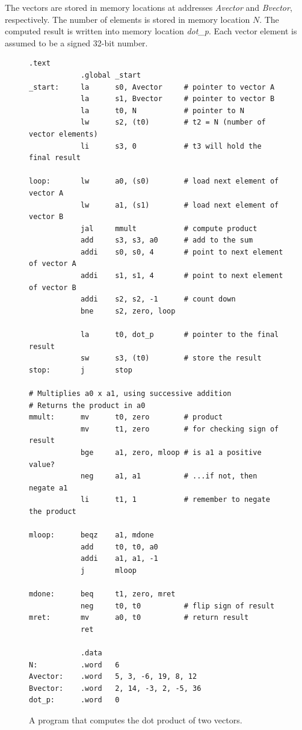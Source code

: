 \documentclass[11pt, twoside, pdftex]{article}
\begin{document}
\noindent
The vectors are stored in memory locations at addresses
{\it Avector} and {\it Bvector}, respectively. The number of elements
is stored in memory location $N$. The computed result is written
into memory location {\it dot\_p}. Each vector element is assumed to be a
signed 32-bit number.

\begin{figure}[H]
\begin{lstlisting}[style=defaultNiosVStyle]
            .text
            .global _start
_start:     la      s0, Avector     # pointer to vector A
            la      s1, Bvector     # pointer to vector B
            la      t0, N           # pointer to N
            lw      s2, (t0)        # t2 = N (number of vector elements)
            li      s3, 0           # t3 will hold the final result
            
loop:       lw      a0, (s0)        # load next element of vector A
            lw      a1, (s1)        # load next element of vector B
            jal     mmult           # compute product
            add     s3, s3, a0      # add to the sum
            addi    s0, s0, 4       # point to next element of vector A
            addi    s1, s1, 4       # point to next element of vector B
            addi    s2, s2, -1      # count down
            bne     s2, zero, loop

            la      t0, dot_p       # pointer to the final result
            sw      s3, (t0)        # store the result
stop:       j       stop

# Multiplies a0 x a1, using successive addition
# Returns the product in a0
mmult:      mv      t0, zero        # product
            mv      t1, zero        # for checking sign of result
            bge     a1, zero, mloop # is a1 a positive value?
            neg     a1, a1          # ...if not, then negate a1
            li      t1, 1           # remember to negate the product

mloop:      beqz    a1, mdone
            add     t0, t0, a0
            addi    a1, a1, -1
            j       mloop

mdone:      beq     t1, zero, mret
            neg     t0, t0          # flip sign of result
mret:       mv      a0, t0          # return result
            ret

            .data
N:          .word   6
Avector:    .word   5, 3, -6, 19, 8, 12
Bvector:    .word   2, 14, -3, 2, -5, 36
dot_p:      .word   0
\end{lstlisting}
	\caption{A program that computes the dot product of two vectors.}
	\label{fig:example}
\end{figure}
 
\end{document}
